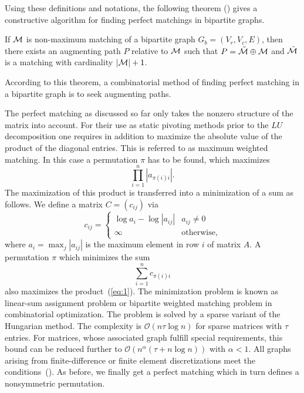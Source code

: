 Using these definitions and notations,
the following theorem (\cite{Berge}) gives a
constructive algorithm for finding perfect matchings in bipartite
graphs.

\begin{theorem}\label{theo:Berge}
If $\mathcal{M}$ is non-maximum matching of a bipartite graph $G_b= (V_r, V_c,E)$, 
then there exists an augmenting path $P$ relative to $\mathcal{M}$ such that
 $P=\tilde{\mathcal{M}} \oplus \mathcal{M}$ and $\tilde{\mathcal{M}}$
is a matching with cardinality $|\mathcal{M}|+1$.
\end{theorem}
According to this theorem, a combinatorial method of finding perfect
matching in a bipartite graph is to seek augmenting paths. 

The
perfect matching as discussed so far only takes the nonzero structure
of the matrix into account. 
For their use as static pivoting methods prior to the $LU$ decomposition
one requires in addition to
maximize the absolute value of the product of the diagonal entries. 
This is referred to as
maximum weighted matching. In this case a permutation
$\pi$ has to be found, which maximizes
\begin{equation}
  \prod_{i=1}^n |a_{\pi(i)i}|. \label{eq:1}
\end{equation}
The maximization of this product is transferred into a minimization of a sum as follows. We define a matrix $C = (c_{ij})$ via
\[
  c_{ij} = 
  \begin{cases}
    \log a_i - \log |a_{ij}| & a_{ij} \neq 0 \\
    \infty                     & \text{otherwise},
  \end{cases}
\]
where $a_i = \max_j |a_{ij}|$  is the maximum element in row $i$ of
matrix $A$. A permutation $\pi$ which minimizes the sum 
\[
  \label{eq:4}
  \sum_{i=1}^n c_{\pi(i)i} 
\]
also maximizes the product~(\ref{eq:1}). The minimization problem is
known as linear-sum assignment problem or bipartite weighted matching
problem in combinatorial optimization.  The problem is solved by a
sparse variant of the Hungarian method. The complexity is
 $\mathcal{O}(n \tau \log n )$ for
sparse matrices with $\tau$ entries. For matrices, whose associated
graph fulfill special requirements, this bound can be reduced further
to $\mathcal{O}(n^\alpha (\tau + n \log n))$ with $\alpha < 1$.  All graphs
arising from finite-difference or finite element discretizations meet
the conditions~(\cite{gupta:99}). As before, we finally get a perfect
matching which in turn defines a nonsymmetric permutation.

